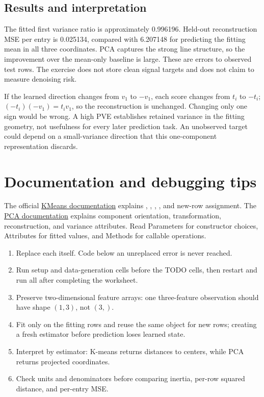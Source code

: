 \subsection{Results and interpretation}
The fitted first variance ratio is approximately 0.996196. Held-out reconstruction MSE per entry is 0.025134,
compared with 6.207148 for predicting the fitting mean in all three coordinates.
PCA captures the strong line structure, so the improvement over the mean-only baseline is large.
These are errors to observed test rows. The exercise does not store clean signal targets and does not claim to measure denoising risk.

If the learned direction changes from $v_1$ to $-v_1$, each score changes from $t_i$ to $-t_i$;
$(-t_i)(-v_1)=t_iv_1$, so the reconstruction is unchanged. Changing only one sign would be wrong.
A high PVE establishes retained variance in the fitting geometry, not usefulness for every later prediction task.
An unobserved target could depend on a small-variance direction that this one-component representation discards.

\newpage
\section*{Documentation and debugging tips}
The official \href{https://scikit-learn.org/1.8/modules/generated/sklearn.cluster.KMeans.html}{KMeans documentation}
explains , , , , and new-row assignment.
The \href{https://scikit-learn.org/1.8/modules/generated/sklearn.decomposition.PCA.html}{PCA documentation}
explains component orientation, transformation, reconstruction, and variance attributes.
Read Parameters for constructor choices, Attributes for fitted values, and Methods for callable operations.

\begin{enumerate}
\item Replace each  itself. Code below an unreplaced error is never reached.
\item Run setup and data-generation cells before the TODO cells, then restart and run all after completing the worksheet.
\item Preserve two-dimensional feature arrays: one three-feature observation should have shape $(1,3)$, not $(3,)$.
\item Fit only on the fitting rows and reuse the same object for new rows; creating a fresh estimator before prediction loses learned state.
\item Interpret  by estimator: K-means returns distances to centers, while PCA returns projected coordinates.
\item Check units and denominators before comparing inertia, per-row squared distance, and per-entry MSE.
\end{enumerate}


